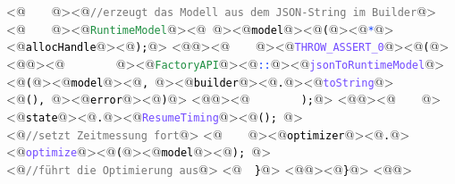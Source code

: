 <@\textcolor[HTML]{000000}{\texttt{\ \ \ \ }}@><@\textcolor[HTML]{777777}{\texttt{//erzeugt\ das\ Modell\ aus\ dem\ JSON-String\ im\ Builder}}@>
<@\textcolor[HTML]{000000}{\texttt{\ \ \ \ }}@><@\textcolor[HTML]{1F8F42}{\texttt{RuntimeModel}}@><@\textcolor[HTML]{000000}{\texttt{\ }}@><@\textcolor[HTML]{000000}{\texttt{model}}@><@\textcolor[HTML]{000000}{\texttt{(}}@><@\textcolor[HTML]{1041FF}{\texttt{*}}@><@\textcolor[HTML]{000000}{\texttt{allocHandle}}@><@\textcolor[HTML]{000000}{\texttt{);}}@>
<@\textcolor[HTML]{000000}{\texttt{}}@><@\textcolor[HTML]{000000}{\texttt{\ \ \ \ }}@><@\textcolor[HTML]{724BFF}{\texttt{THROW\_ASSERT\_0}}@><@\textcolor[HTML]{000000}{\texttt{(}}@>
<@\textcolor[HTML]{000000}{\texttt{}}@><@\textcolor[HTML]{000000}{\texttt{\ \ \ \ \ \ \ \ }}@><@\textcolor[HTML]{1F8F42}{\texttt{FactoryAPI}}@><@\textcolor[HTML]{1041FF}{\texttt{::}}@><@\textcolor[HTML]{724BFF}{\texttt{jsonToRuntimeModel}}@><@\textcolor[HTML]{000000}{\texttt{(}}@><@\textcolor[HTML]{000000}{\texttt{model}}@><@\textcolor[HTML]{000000}{\texttt{,\ }}@><@\textcolor[HTML]{000000}{\texttt{builder}}@><@\textcolor[HTML]{000000}{\texttt{.}}@><@\textcolor[HTML]{724BFF}{\texttt{toString}}@><@\textcolor[HTML]{000000}{\texttt{(),\ }}@><@\textcolor[HTML]{000000}{\texttt{error}}@><@\textcolor[HTML]{000000}{\texttt{)}}@>
<@\textcolor[HTML]{000000}{\texttt{}}@><@\textcolor[HTML]{000000}{\texttt{\ \ \ \ \ \ \ \ );}}@>
<@\textcolor[HTML]{000000}{\texttt{}}@><@\textcolor[HTML]{000000}{\texttt{\ \ \ \ }}@><@\textcolor[HTML]{000000}{\texttt{state}}@><@\textcolor[HTML]{000000}{\texttt{.}}@><@\textcolor[HTML]{724BFF}{\texttt{ResumeTiming}}@><@\textcolor[HTML]{000000}{\texttt{();\ }}@><@\textcolor[HTML]{777777}{\texttt{//setzt\ Zeitmessung\ fort}}@>
<@\textcolor[HTML]{000000}{\texttt{\ \ \ \ }}@><@\textcolor[HTML]{000000}{\texttt{optimizer}}@><@\textcolor[HTML]{000000}{\texttt{.}}@><@\textcolor[HTML]{724BFF}{\texttt{optimize}}@><@\textcolor[HTML]{000000}{\texttt{(}}@><@\textcolor[HTML]{000000}{\texttt{model}}@><@\textcolor[HTML]{000000}{\texttt{);\ }}@><@\textcolor[HTML]{777777}{\texttt{//führt\ die\ Optimierung\ aus}}@>
<@\textcolor[HTML]{000000}{\texttt{\ \ \}}}@>
<@\textcolor[HTML]{000000}{\texttt{}}@><@\textcolor[HTML]{000000}{\texttt{\}}}@>
<@\textcolor[HTML]{000000}{\texttt{}}@>